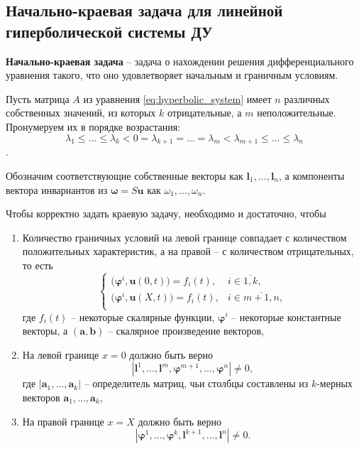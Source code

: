 \documentclass{article}
\begin{document}
\subsection{Начально-краевая задача для линейной гиперболической системы ДУ}

\begin{define}
	\textbf{Начально-краевая задача} -- задача о нахождении решения
	дифференциального уравнения такого, что оно удовлетворяет начальным
	и граничным условиям.
\end{define}

\begin{theorem}\label{eq:boundary_problem_condition}
	Пусть матрица $A$ из уравнения \eqref{eq:hyperbolic_system} имеет $n$
	различных собственных значений, из которых $k$ отрицательные, а $m$
	неположительные. Пронумеруем их в порядке возрастания:
	\[\lambda_1\le...\le\lambda_k<0=\lambda_{k+1}=...=\lambda_m<
	\lambda_{m+1}\le...\le\lambda_n\].

	Обозначим соответствующие собственные векторы как $\boldsymbol l_1,...,
	\boldsymbol l_n$,
	а компоненты вектора инвариантов из $\boldsymbol\omega=S\boldsymbol u$
	как $\omega_1,...,\omega_n$.

	Чтобы корректно задать краевую задачу, необходимо и достаточно, чтобы

	\begin{enumerate}[nosep]
		\item
			Количество граничных условий на левой границе совпадает с
			количеством положительных характеристик, а на правой --
			с количеством отрицательных, то есть
			\[
				\begin{cases}
					\big(\boldsymbol\varphi^i,
						\boldsymbol u(0,t)\big)=f_i(t),&
						i\in\overline{1,k}, \\
					\big(\boldsymbol\varphi^i,
						\boldsymbol u(X,t)\big)=f_i(t),&
						i\in\overline{m+1,n}, \\
				\end{cases}
			\]
			где $f_i(t)$ -- некоторые скалярные функции,
			$\boldsymbol\varphi^i$ -- некоторые константные векторы,
			а $(\boldsymbol a,\boldsymbol b)$ -- скалярное
			произведение векторов,
		\item
			На левой границе $x=0$ должно быть верно
			\[|\boldsymbol l^1,...,\boldsymbol l^m,
			\boldsymbol\varphi^{m+1},...,
			\boldsymbol\varphi^n|\ne 0,\]
			где $|\boldsymbol a_1,...,\boldsymbol a_k|$ --
			определитель матриц, чьи столбцы составлены из
			$k$-мерных векторов $\boldsymbol a_1,...,
			\boldsymbol a_k$,
		\item
			На правой границе $x=X$ должно быть верно
			\[|\boldsymbol\varphi^1,...,\boldsymbol\varphi^k,
			\boldsymbol l^{k+1},...,\boldsymbol l^n|\ne 0.\]
	\end{enumerate}
\end{theorem}
\end{document}
